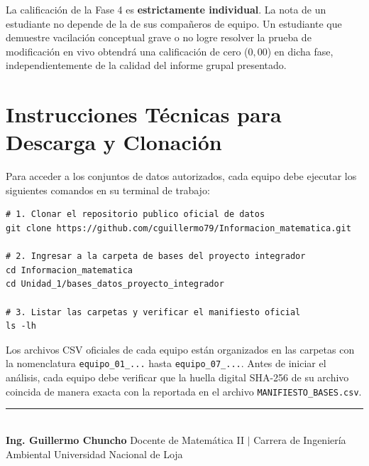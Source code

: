 \documentclass[11pt,a4paper]{article}
\begin{document}
\begin{alertbox}[title=Principio de Evaluación Individual en la Fase 4]
La calificación de la Fase 4 es \textbf{estrictamente individual}. La nota de un estudiante no depende de la de sus compañeros de equipo. Un estudiante que demuestre vacilación conceptual grave o no logre resolver la prueba de modificación en vivo obtendrá una calificación de cero ($0{,}00$) en dicha fase, independientemente de la calidad del informe grupal presentado.
\end{alertbox}

\vspace{0.15cm}

\section{Instrucciones Técnicas para Descarga y Clonación}

Para acceder a los conjuntos de datos autorizados, cada equipo debe ejecutar los siguientes comandos en su terminal de trabajo:

\begin{examplebox}[title=Comandos de Clonación del Repositorio de Datos]
\begin{verbatim}
# 1. Clonar el repositorio publico oficial de datos
git clone https://github.com/cguillermo79/Informacion_matematica.git

# 2. Ingresar a la carpeta de bases del proyecto integrador
cd Informacion_matematica
cd Unidad_1/bases_datos_proyecto_integrador

# 3. Listar las carpetas y verificar el manifiesto oficial
ls -lh
\end{verbatim}
\end{examplebox}

\noindent Los archivos CSV oficiales de cada equipo están organizados en las carpetas con la nomenclatura \texttt{equipo\_01\_\allowbreak ...} hasta \texttt{equipo\_07\_\allowbreak ...}. Antes de iniciar el análisis, cada equipo debe verificar que la huella digital SHA-256 de su archivo coincida de manera exacta con la reportada en el archivo \texttt{MANIFIESTO\_\allowbreak BASES.csv}.

\vspace{0.35cm}
\begin{center}
  \rule{0.6\textwidth}{0.6pt}\\[0.15cm]
  {\footnotesize\textbf{Ing. Guillermo Chuncho}\newline
  Docente de Matemática II $\vert$ Carrera de Ingeniería Ambiental\newline
  Universidad Nacional de Loja}
\end{center}
\end{document}
